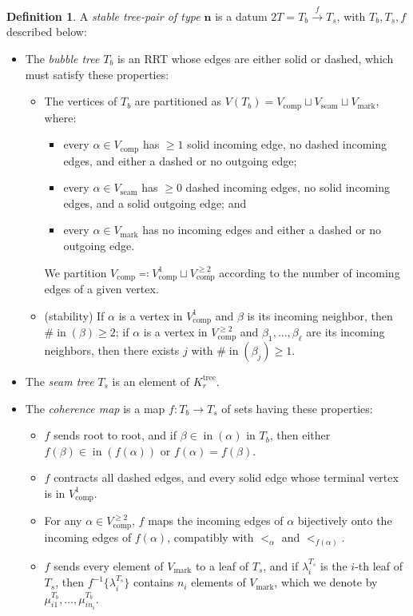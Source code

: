 \documentclass[11pt]{amsart}
\theoremstyle{definition}
\newtheorem{definition}[theorem]{Definition}
\theoremstyle{remark}
\theoremstyle{plain}
\newcommand\bn{\mathbf{n}}
\newcommand{\on}{\operatorname}
\newcommand{\comp}{C^2}
\renewcommand{\comp}{{\on{comp}}}
\newcommand{\seam}{{\on{seam}}}
\newcommand{\mk}{{\on{mark}}}
\newcommand{\incom}{\on{in}}
\newcommand{\tree}{{\on{tree}}}
\newcommand{\sr}{\stackrel}
\begin{document}
\begin{definition}
\label{p:2T}
A \emph{stable tree-pair of type $\bn$} is a datum $2T = T_b \sr{f}{\to} T_s$, with $T_b, T_s, f$ described below:
\begin{itemize}
\item The \emph{bubble tree} $T_b$ is an RRT whose edges are either solid or dashed, which must satisfy these properties:
	\begin{itemize}
		\item The vertices of $T_b$ are partitioned as $V(T_b) = V_\comp \sqcup V_\seam \sqcup V_\mk$, where:
			\begin{itemize}
				\item every $\alpha \in V_\comp$ has $\geq 1$ solid incoming edge, no dashed incoming edges, and either a dashed or no outgoing edge;
				\item every $\alpha \in V_\seam$ has $\geq 0$ dashed incoming edges, no solid incoming edges, and a solid outgoing edge; and
				\item every $\alpha \in V_\mk$ has no incoming edges and either a dashed or no outgoing edge.
			\end{itemize}
			We partition $V_\comp \eqqcolon V_\comp^1 \sqcup V_\comp^{\geq2}$ according to the number of incoming edges of a given vertex.
		\item ({\sc stability}) If $\alpha$ is a vertex in $V_\comp^1$ and $\beta$ is its incoming neighbor, then $\#\!\incom(\beta) \geq 2$; if $\alpha$ is a vertex in $V_\comp^{\geq2}$ and $\beta_1,\ldots,\beta_\ell$ are its incoming neighbors, then there exists $j$ with $\#\!\incom(\beta_j) \geq 1$.
	\end{itemize}
	\item The \emph{seam tree} $T_s$ is an element of $K_r^\tree$.
	\item The \emph{coherence map} is a map $f\colon T_b \to T_s$ of sets having these properties:
		\begin{itemize}
			\item $f$ sends root to root, and if $\beta \in \incom(\alpha)$ in $T_b$, then either $f(\beta) \in \incom(f(\alpha))$ or $f(\alpha) = f(\beta)$.
			\item $f$ contracts all dashed edges, and every solid edge whose terminal vertex is in $V_\comp^1$.
			\item For any $\alpha \in V_\comp^{\geq2}$, $f$ maps the incoming edges of $\alpha$ bijectively onto the incoming edges of $f(\alpha)$, compatibly with $<_\alpha$ and $<_{f(\alpha)}$.
			\item $f$ sends every element of $V_\mk$ to a leaf of $T_s$, and if $\lambda_i^{T_s}$ is the $i$-th leaf of $T_s$, then $f^{-1}\{\lambda_i^{T_s}\}$ contains $n_i$ elements of $V_\mk$, which we denote by $\mu_{i1}^{T_b},\ldots,\mu_{in_i}^{T_b}$.

\end{itemize}
\end{itemize}
\end{definition}
\end{document}
